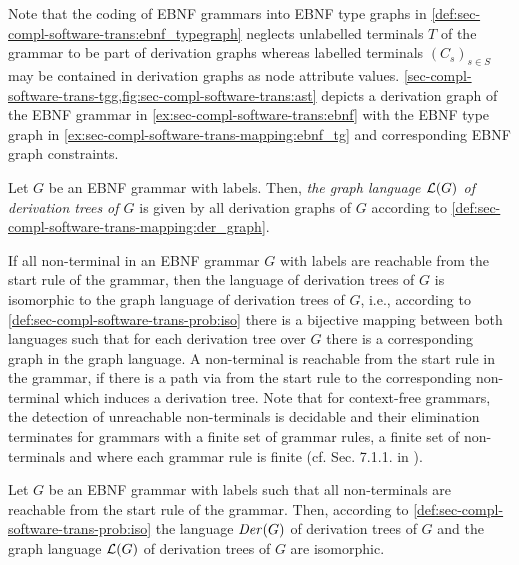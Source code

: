 \begin{example}
Note that the coding of EBNF grammars into EBNF type graphs in \cref{def:sec-compl-software-trans:ebnf_typegraph} neglects unlabelled terminals $T$ of the grammar to be part of derivation graphs whereas labelled terminals $(C_s)_{s \in S}$ may be contained in derivation graphs as node attribute values.
\cref{sec-compl-software-trans-tgg,fig:sec-compl-software-trans:ast} depicts a derivation graph of the EBNF grammar in \cref{ex:sec-compl-software-trans:ebnf} with the EBNF type graph in \cref{ex:sec-compl-software-trans-mapping:ebnf_tg} and corresponding EBNF graph constraints.
\envEndMarker
\end{example}

\begin{definition}
\label{def:sec-compl-software-trans:graph_lang_der}
Let $G$ be an EBNF grammar with labels.
Then, \emph{the graph language $\mathcal{L}(G)$ of derivation trees of $G$} is given by all derivation graphs of $G$ according to \cref{def:sec-compl-software-trans-mapping:der_graph}.
\envEndMarker
\end{definition}

If all non-terminal in an EBNF grammar $G$ with labels are reachable from the start rule of the grammar, then the language of derivation trees of $G$ is isomorphic to the graph language of derivation trees of $G$, i.e., according to \cref{def:sec-compl-software-trans-prob:iso} there is a bijective mapping between both languages such that for each derivation tree over $G$ there is a corresponding graph in the graph language.
A non-terminal is reachable from the start rule in the grammar, if there is a path via from the start rule to the corresponding non-terminal which induces a derivation tree.
Note that for context-free grammars, the detection of unreachable non-terminals is decidable and their elimination terminates for grammars with a finite set of grammar rules, a finite set of non-terminals and where each grammar rule is finite (cf. Sec. 7.1.1. in \cite{DBLP:books/daglib/0011126}).

\begin{claim}
\label{thm:sec-compl-software-trans:equ_lang_der}
Let $G$ be an EBNF grammar with labels such that all non-terminals are reachable from the start rule of the grammar.
Then, according to \cref{def:sec-compl-software-trans-prob:iso} the language $\mathit{Der}(G)$ of derivation trees of $G$ and the graph language $\mathcal{L}(G)$ of derivation trees of $G$ are isomorphic.
\envEndMarker
\end{claim}
